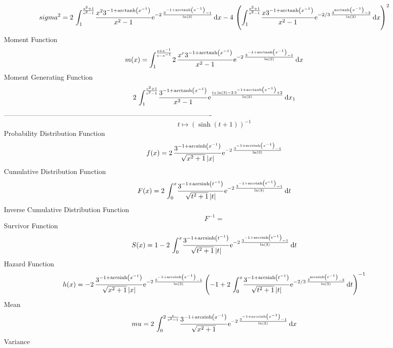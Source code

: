 \documentclass[12pt]{article}
\begin{document}
 $$ sigma^2 = 2\,\int_{1}^{{\frac {{{\rm e}^{2}}+1}{{{\rm e}^{2}}-1}}}\!{\frac {{x}^
{2}{3}^{-1+{\rm arctanh} \left({x}^{-1}\right)}}{{x}^{2}-1}{{\rm e}^{-
2\,{\frac {{3}^{-1+{\rm arctanh} \left({x}^{-1}\right)}-1}{\ln 
 \left( 3 \right) }}}}}\,{\rm d}x-4\, \left( \int_{1}^{{\frac {{
{\rm e}^{2}}+1}{{{\rm e}^{2}}-1}}}\!{\frac {x{3}^{-1+{\rm arctanh} 
\left({x}^{-1}\right)}}{{x}^{2}-1}{{\rm e}^{-2/3\,{\frac {{3}^{
{\rm arctanh} \left({x}^{-1}\right)}-3}{\ln  \left( 3 \right) }}}}}
\,{\rm d}x \right) ^{2}
$$Moment Function 
 $$ m(x) = \int_{1}^{{\frac {{\rm e}+{{\rm e}^{-1}}}{{\rm e}-{{\rm e}^{-1}}}}}\!2
\,{\frac {{x}^{r}{3}^{-1+{\rm arctanh} \left({x}^{-1}\right)}}{{x}^{2}
-1}{{\rm e}^{-2\,{\frac {{3}^{-1+{\rm arctanh} \left({x}^{-1}\right)}-
1}{\ln  \left( 3 \right) }}}}}\,{\rm d}x
$$ Moment Generating Function 
 $$2\,\int_{1}^{{\frac {{{\rm e}^{2}}+1}{{{\rm e}^{2}}-1}}}\!{\frac {{3}^
{-1+{\rm arctanh} \left({x}^{-1}\right)}}{{x}^{2}-1}{{\rm e}^{{\frac {
tx\ln  \left( 3 \right) -2\,{3}^{-1+{\rm arctanh} \left({x}^{-1}
\right)}+2}{\ln  \left( 3 \right) }}}}}\,{\rm d}x_{{1}}
$$-------------------------------------------------------------------------------------------  \\$$t\mapsto  \left( \sinh \left( t+1 \right)  \right) ^{-1}
$$Probability Distribution Function 
$$  f(x)=2\,{\frac {{3}^{-1+{\rm arcsinh} \left({x}^{-1}\right)}}{\sqrt {{x}^{2
}+1} \left| x \right| }{{\rm e}^{-2\,{\frac {{3}^{-1+{\rm arcsinh} 
\left({x}^{-1}\right)}-1}{\ln  \left( 3 \right) }}}}}
$$Cumulative Distribution Function  
 $$F(x)=2\,\int_{0}^{x}\!{\frac {{3}^{-1+{\rm arcsinh} \left({t}^{-1}\right)}
}{\sqrt {{t}^{2}+1} \left| t \right| }{{\rm e}^{-2\,{\frac {{3}^{-1+
{\rm arcsinh} \left({t}^{-1}\right)}-1}{\ln  \left( 3 \right) }}}}}
\,{\rm d}t
$$ Inverse Cumulative Distribution Function 
  $$F^{-1} = $$Survivor Function 
 $$ S(x)=1-2\,\int_{0}^{x}\!{\frac {{3}^{-1+{\rm arcsinh} \left({t}^{-1}\right)
}}{\sqrt {{t}^{2}+1} \left| t \right| }{{\rm e}^{-2\,{\frac {{3}^{-1+
{\rm arcsinh} \left({t}^{-1}\right)}-1}{\ln  \left( 3 \right) }}}}}
\,{\rm d}t
$$ Hazard Function 
 $$ h(x)=-2\,{\frac {{3}^{-1+{\rm arcsinh} \left({x}^{-1}\right)}}{\sqrt {{x}^{
2}+1} \left| x \right| }{{\rm e}^{-2\,{\frac {{3}^{-1+{\rm arcsinh} 
\left({x}^{-1}\right)}-1}{\ln  \left( 3 \right) }}}} \left( -1+2\,
\int_{0}^{x}\!{\frac {{3}^{-1+{\rm arcsinh} \left({t}^{-1}\right)}}{
\sqrt {{t}^{2}+1} \left| t \right| }{{\rm e}^{-2/3\,{\frac {{3}^{
{\rm arcsinh} \left({t}^{-1}\right)}-3}{\ln  \left( 3 \right) }}}}}
\,{\rm d}t \right) ^{-1}}
$$Mean 
 $$ mu=2\,\int_{0}^{2\,{\frac {{\rm e}}{{{\rm e}^{2}}-1}}}\!{\frac {{3}^{-1+
{\rm arcsinh} \left({x}^{-1}\right)}}{\sqrt {{x}^{2}+1}}{{\rm e}^{-2\,
{\frac {{3}^{-1+{\rm arcsinh} \left({x}^{-1}\right)}-1}{\ln  \left( 3
 \right) }}}}}\,{\rm d}x
$$ Variance 
\end{document}
